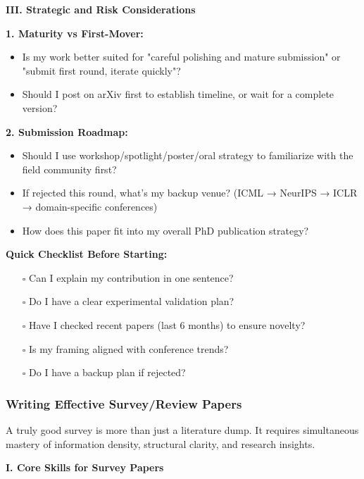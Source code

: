 \documentclass[11pt,a4paper]{article}
\begin{document}
\textbf{III. Strategic and Risk Considerations}

\textbf{1. Maturity vs First-Mover:}
\begin{itemize}
    \item Is my work better suited for "careful polishing and mature submission" or "submit first round, iterate quickly"?
    \item Should I post on arXiv first to establish timeline, or wait for a complete version?
\end{itemize}

\textbf{2. Submission Roadmap:}
\begin{itemize}
    \item Should I use workshop/spotlight/poster/oral strategy to familiarize with the field community first?
    \item If rejected this round, what's my backup venue? (ICML → NeurIPS → ICLR → domain-specific conferences)
    \item How does this paper fit into my overall PhD publication strategy?
\end{itemize}

\textbf{Quick Checklist Before Starting:}
\begin{enumerate}
    \item[$\square$] Can I explain my contribution in one sentence?
    \item[$\square$] Do I have a clear experimental validation plan?
    \item[$\square$] Have I checked recent papers (last 6 months) to ensure novelty?
    \item[$\square$] Is my framing aligned with conference trends?
    \item[$\square$] Do I have a backup plan if rejected?
\end{enumerate}

\subsubsection{Writing Effective Survey/Review Papers}

\begin{tcolorbox}[colback=green!5,colframe=green!50,title=The Value of Survey Papers]
A truly good survey is more than just a literature dump. It requires simultaneous mastery of information density, structural clarity, and research insights.
\end{tcolorbox}

\textbf{I. Core Skills for Survey Papers}
\end{document}

